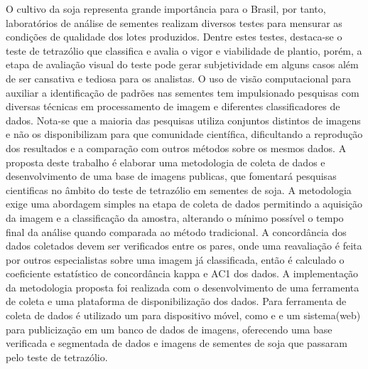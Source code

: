 \begin{resumo} 

	O cultivo da soja  representa grande importância para o Brasil, por tanto, laboratórios de análise de sementes realizam diversos testes para mensurar as condições de qualidade dos lotes produzidos. Dentre estes testes, destaca-se o teste de tetrazólio que classifica e avalia o vigor e viabilidade de plantio, porém, a etapa de avaliação visual do teste pode gerar subjetividade em alguns casos além de ser cansativa e tediosa para os analistas. 
	O uso de visão computacional para auxiliar a identificação de padrões nas sementes tem impulsionado pesquisas com diversas técnicas em processamento de imagem e diferentes classificadores de dados. Nota-se que a maioria das pesquisas utiliza conjuntos distintos de imagens e não os disponibilizam para que comunidade científica, dificultando a reprodução dos resultados e a comparação com outros métodos sobre os mesmos dados.
	A proposta deste trabalho é elaborar uma metodologia de coleta de dados e desenvolvimento de uma base de imagens publicas, que fomentará pesquisas cientificas no âmbito do teste de tetrazólio em sementes de soja. 
	A metodologia exige uma abordagem simples na etapa de coleta de dados permitindo a aquisição da imagem e a classificação da amostra, alterando o mínimo possível o tempo final da análise quando comparada ao método tradicional. A concordância dos dados coletados devem ser verificados entre os pares, onde uma reavaliação é feita por outros especialistas sobre uma imagem já classificada, então é calculado o coeficiente estatístico de concordância kappa e AC1 dos dados.
	A implementação da metodologia proposta foi realizada com o desenvolvimento de uma ferramenta de coleta e uma plataforma de disponibilização dos dados. Para ferramenta de coleta de dados é utilizado um  para dispositivo móvel, como  e  e um sistema(web) para publicização em um banco de dados de imagens, oferecendo uma base verificada e segmentada de dados e imagens de sementes de soja que passaram pelo teste de tetrazólio.
	
	
		 
\end{resumo}
	